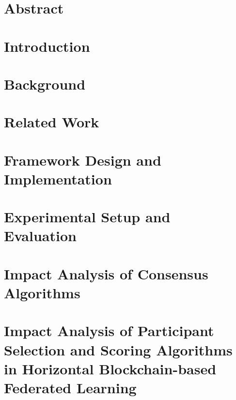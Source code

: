 \documentclass[12pt,a4paper,oneside]{book}
\begin{document}



\chapter*{Abstract}\label{chapter:abstract}


\tableofcontents

\listoffigures

\listoftables

\chapter{Introduction}\label{chapter:introduction}


\chapter{Background}\label{chapter:background}


\chapter{Related Work}\label{chapter:related_work}


\chapter{Framework Design and Implementation}\label{chapter:framework}


\chapter{Experimental Setup and Evaluation}\label{chapter:evaluation}


\chapter{Impact Analysis of Consensus Algorithms}\label{chapter:analysis:consensus_algorithms}


\chapter{Impact Analysis of Participant Selection and Scoring Algorithms in Horizontal Blockchain-based Federated Learning}\label{chapter:horizontal}

\end{document}
